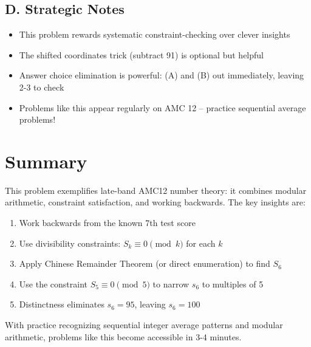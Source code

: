 \documentclass[11pt]{article}
\begin{document}
\begin{competitionbox}
\subsection*{D. Strategic Notes}
\begin{itemize}[leftmargin=*]
    \item This problem rewards systematic constraint-checking over clever insights
    \item The shifted coordinates trick (subtract 91) is optional but helpful
    \item Answer choice elimination is powerful: (A) and (B) out immediately, leaving 2-3 to check
    \item Problems like this appear regularly on AMC 12 -- practice sequential average problems!
\end{itemize}
\end{competitionbox}

\section*{Summary}

This problem exemplifies late-band AMC12 number theory: it combines modular arithmetic, constraint satisfaction, and working backwards. The key insights are:
\begin{enumerate}
    \item Work backwards from the known 7th test score
    \item Use divisibility constraints: $S_k \equiv 0 \pmod{k}$ for each $k$
    \item Apply Chinese Remainder Theorem (or direct enumeration) to find $S_6$
    \item Use the constraint $S_5 \equiv 0 \pmod{5}$ to narrow $s_6$ to multiples of 5
    \item Distinctness eliminates $s_6 = 95$, leaving $s_6 = 100$
\end{enumerate}

With practice recognizing sequential integer average patterns and modular arithmetic, problems like this become accessible in 3-4 minutes.
\end{document}
